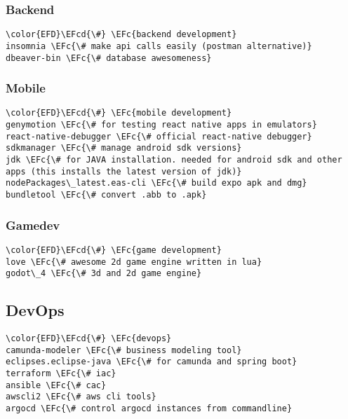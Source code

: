 \documentclass[14pt]{article}
\newcommand{\EFc}[1]{\textcolor{EFc}{#1}} %
\newcommand{\EFcd}[1]{\textcolor{EFcd}{#1}} %
\begin{document}
\subsubsection{Backend}
\label{sec:orge19041c}
\begin{Code}
\begin{Verbatim}
\color{EFD}\EFcd{\#} \EFc{backend development}
insomnia \EFc{\# make api calls easily (postman alternative)}
dbeaver-bin \EFc{\# database awesomeness}

\end{Verbatim}
\end{Code}
\subsubsection{Mobile}
\label{sec:orge6e395f}
\begin{Code}
\begin{Verbatim}
\color{EFD}\EFcd{\#} \EFc{mobile development}
genymotion \EFc{\# for testing react native apps in emulators}
react-native-debugger \EFc{\# official react-native debugger}
sdkmanager \EFc{\# manage android sdk versions}
jdk \EFc{\# for JAVA installation. needed for android sdk and other apps (this installs the latest version of jdk)}
nodePackages\_latest.eas-cli \EFc{\# build expo apk and dmg}
bundletool \EFc{\# convert .abb to .apk}

\end{Verbatim}
\end{Code}
\subsubsection{Gamedev}
\label{sec:orgf1b644d}
\begin{Code}
\begin{Verbatim}
\color{EFD}\EFcd{\#} \EFc{game development}
love \EFc{\# awesome 2d game engine written in lua}
godot\_4 \EFc{\# 3d and 2d game engine}

\end{Verbatim}
\end{Code}
\subsection{DevOps}
\label{sec:orga5c46de}
\begin{Code}
\begin{Verbatim}
\color{EFD}\EFcd{\#} \EFc{devops}
camunda-modeler \EFc{\# business modeling tool}
eclipses.eclipse-java \EFc{\# for camunda and spring boot}
terraform \EFc{\# iac}
ansible \EFc{\# cac}
awscli2 \EFc{\# aws cli tools}
argocd \EFc{\# control argocd instances from commandline}

\end{Verbatim}
\end{Code}
\end{document}
